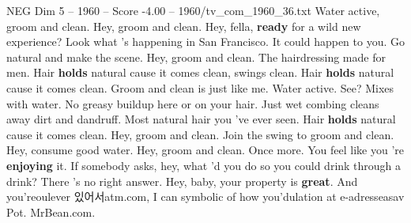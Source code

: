 \begin{textsample}{NEG Dim 5 – 1960 – Score -4.00 – 1960/tv\_com\_1960\_36.txt}  \label{ex:f5_neg_002}
Water active, groom and clean.
Hey, groom and clean.
Hey, fella, \textbf{ready} for a wild new experience?
Look what 's happening in San Francisco.
It could happen to you.
Go natural and make the scene.
Hey, groom and clean.
The hairdressing made for men.
Hair \textbf{holds} natural cause it comes clean, swings clean.
Hair \textbf{holds} natural cause it comes clean.
Groom and clean is just like me.
Water active.
See?
Mixes with water.
No greasy buildup here or on your hair.
Just wet combing cleans away dirt and dandruff.
Most natural hair you 've ever seen.
Hair \textbf{holds} natural cause it comes clean.
Hey, groom and clean.
Join the swing to groom and clean.
Hey, consume good water.
Hey, groom and clean.
Once more.
You feel like you 're \textbf{enjoying} it.
If somebody asks, hey, what 'd you do so you could drink through a drink?
There 's no right answer.
Hey, baby, your property is \textbf{great}.
And you'reoulever 있어서atm.com, I can symbolic of how you'dulation at e-adresseasav Pot.
MrBean.com.

\end{textsample}

